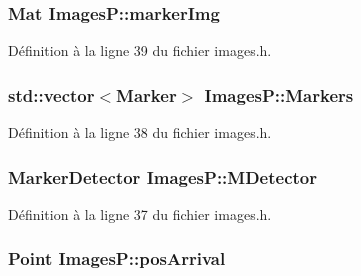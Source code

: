 \hypertarget{class_images_p_add620ec27d299fe470cade4a6bc1e632}{
\subsubsection[{marker\-Img}]{\setlength{\rightskip}{0pt plus 5cm}Mat Images\-P\-::marker\-Img\hspace{0.3cm}{\ttfamily [private]}}}\label{class_images_p_add620ec27d299fe470cade4a6bc1e632}


Définition à la ligne 39 du fichier images.\-h.

\hypertarget{class_images_p_ac2813bc8a3edac420df686902806172c}{
\subsubsection[{Markers}]{\setlength{\rightskip}{0pt plus 5cm}std\-::vector$<$Marker$>$ Images\-P\-::\-Markers\hspace{0.3cm}{\ttfamily [private]}}}\label{class_images_p_ac2813bc8a3edac420df686902806172c}


Définition à la ligne 38 du fichier images.\-h.

\hypertarget{class_images_p_a43a0e66ed75a147c27474937f8c9112c}{
\subsubsection[{M\-Detector}]{\setlength{\rightskip}{0pt plus 5cm}Marker\-Detector Images\-P\-::\-M\-Detector\hspace{0.3cm}{\ttfamily [private]}}}\label{class_images_p_a43a0e66ed75a147c27474937f8c9112c}


Définition à la ligne 37 du fichier images.\-h.

\hypertarget{class_images_p_a621b649c63d3967849103c03082af64c}{
\subsubsection[{pos\-Arrival}]{\setlength{\rightskip}{0pt plus 5cm}Point Images\-P\-::pos\-Arrival}}\label{class_images_p_a621b649c63d3967849103c03082af64c}


